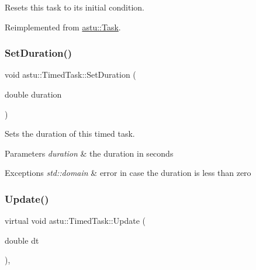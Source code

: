 Resets this task to its initial condition. 

Reimplemented from \hyperlink{classastu_1_1Task_af68025df1de6ad31882f0ccee5ccb100}{astu\+::\+Task}.

\mbox{\label{classastu_1_1TimedTask_a69dbe9174c108800f8a882d43c37c53a}} 
\subsubsection{\texorpdfstring{Set\+Duration()}{SetDuration()}}
{\footnotesize\ttfamily void astu\+::\+Timed\+Task\+::\+Set\+Duration (\begin{DoxyParamCaption}\item[{double}]{duration }\end{DoxyParamCaption})\hspace{0.3cm}{\ttfamily [protected]}}

Sets the duration of this timed task.


\begin{DoxyParams}{Parameters}
{\em duration} & the duration in seconds \\
\hline
\end{DoxyParams}

\begin{DoxyExceptions}{Exceptions}
{\em std\+::domain} & error in case the duration is less than zero \\
\hline
\end{DoxyExceptions}
\mbox{\label{classastu_1_1TimedTask_a5e850f0352294d2c9b302e1a56c6eb09}} 
\subsubsection{\texorpdfstring{Update()}{Update()}}
{\footnotesize\ttfamily virtual void astu\+::\+Timed\+Task\+::\+Update (\begin{DoxyParamCaption}\item[{double}]{dt }\end{DoxyParamCaption})\hspace{0.3cm}{\ttfamily [override]}, {\ttfamily [virtual]}}

